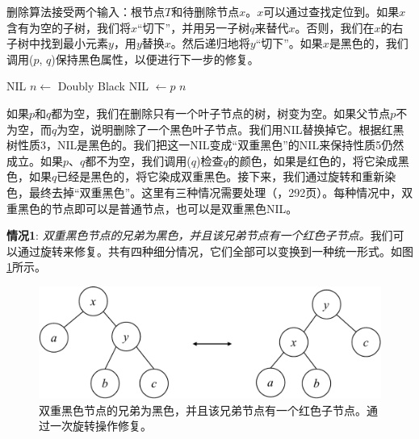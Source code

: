 \documentclass[b5paper]{ctexart}
\begin{document}
删除算法接受两个输入：根节点$T$和待删除节点$x$。$x$可以通过查找定位到。如果$x$含有为空的子树，我们将$x$“切下”，并用另一子树$q$来替代$x$。否则，我们在$x$的右子树中找到最小元素$y$，用$y$替换$x$。然后递归地将$y$“切下”。如果$x$是黑色的，我们调用($p$, $q$)保持黑色属性，以便进行下一步的修复。

\begin{algorithmic}[1]
    \State \Return NIL 
    \State $n \gets$ Doubly Black NIL
    \State {} $\gets p$
    \State \Return $n$
  \Else
    \State \Return {}
  \EndIf
\EndFunction
\end{algorithmic}

如果$p$和$q$都为空，我们在删除只有一个叶子节点的树，树变为空。如果父节点$p$不为空，而$q$为空，说明删除了一个黑色叶子节点。我们用NIL替换掉它。根据红黑树性质3，NIL是黑色的。我们把这一NIL变成“双重黑色”的NIL来保持性质5仍然成立。如果$p$、$q$都不为空，我们调用($q$)检查$q$的颜色，如果是红色的，将它染成黑色，如果$q$已经是黑色的，将它染成双重黑色。接下来，我们通过旋转和重新染色，最终去掉“双重黑色”。这里有三种情况需要处理（\cite{CLRS}，292页）。每种情况中，双重黑色的节点即可以是普通节点，也可以是双重黑色NIL。

\textbf{情况1}: {\em 双重黑色节点的兄弟为黑色，并且该兄弟节点有一个红色子节点。}我们可以通过旋转来修复。共有四种细分情况，它们全部可以变换到一种统一形式。如图\cref{fig:del-case1}所示。

\begin{figure}[htbp]
   \centering
   \includegraphics[scale=0.4, page=3]{../../../datastruct/tree/red-black-tree/img/rbtree}
   \caption{双重黑色节点的兄弟为黑色，并且该兄弟节点有一个红色子节点。通过一次旋转操作修复。}
   \label{fig:del-case1}
\end{figure}
\end{document}
